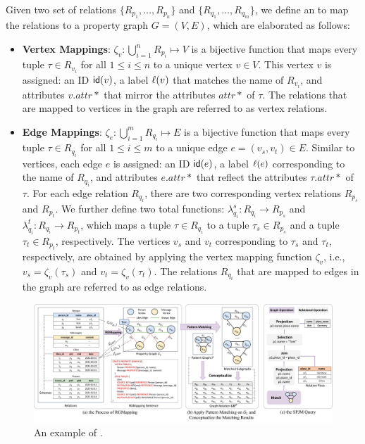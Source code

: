 \begin{definition}[\rgmapping]
\label{def:rgmapping}
Given two set of relations $\{R_{p_1}, \ldots, R_{p_n}\}$ and $\{R_{q_1}, \ldots, R_{q_m}\}$,
we define an \rgmapping to map the relations to a property graph $G = (V, E)$, %
which are elaborated as follows:

\begin{itemize}
\item \textbf{Vertex Mappings}: $\zeta_v: \bigcup_{i=1}^{n} R_{p_i} \mapsto V$ is a bijective function that maps every tuple $\tau \in R_{v_i}$ for all $1 \leq i \leq n$ to a unique vertex $v \in V$. This vertex $v$ is assigned: an ID ${\mathsf{id}}(v)$, a label $\mathcal{\ell}(v)$ that matches the name of $R_{v_i}$, and attributes $v.attr*$ that mirror the attributes $attr*$ of $\tau$.
The relations that are mapped to vertices in the graph are referred to as vertex relations.

\item \textbf{Edge Mappings}: $\zeta_e: \bigcup_{i=1}^{m} R_{q_i} \mapsto E$ is a bijective function that maps every tuple $\tau \in R_{q_i}$ for all $1 \leq i \leq m$ to a unique edge $e = (v_s, v_t) \in E$. Similar to vertices, each edge $e$ is assigned: an ID ${\mathsf{id}}(e)$,
a label $\mathcal{\ell}(e)$ corresponding to the name of $R_{q_i}$, and attributes $e.attr*$ that reflect the attributes $\tau.attr*$ of $\tau$.
For each edge relation $R_{q_i}$, there are two corresponding vertex relations $R_{p_s}$ and $R_{p_t}$.
We further define two total functions: $\lambda_{q_i}^s: R_{q_i} \to R_{p_s}$ and $\lambda_{q_i}^t: R_{q_i} \to R_{p_t}$, which maps a tuple $\tau \in R_{q_i}$ to a tuple $\tau_s \in R_{p_s}$ and a tuple $\tau_t \in R_{p_t}$, respectively.
The vertices $v_s$ and $v_t$ corresponding to $\tau_s$ and $\tau_t$, respectively, are obtained by applying the vertex mapping function $\zeta_v$, i.e., $v_s = \zeta_v(\tau_s)$ and $v_t = \zeta_v(\tau_t)$.
The relations $R_{q_i}$ that are mapped to edges in the graph are referred to as edge relations.
\end{itemize}
\end{definition}

\begin{figure}
    \centering
    \includegraphics[width=\linewidth]{./figures/rgmapping.pdf}
    \caption{An example of \rgmapping.}
    \label{fig:intro-rgmapping-example}
\end{figure}

